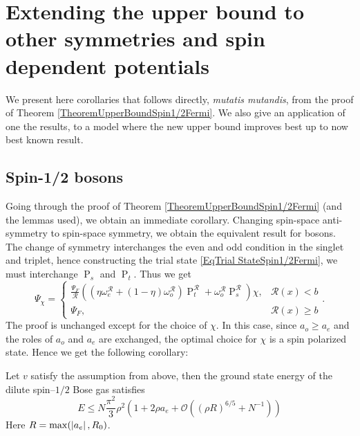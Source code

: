 \section{Extending the upper bound to other symmetries and spin dependent potentials}
We present here corollaries that follows directly, \emph{mutatis mutandis}, from the proof of Theorem \ref{TheoremUpperBoundSpin1/2Fermi}. We also give an application of one the results, to a model where the new upper bound improves best up to now best known result.
\subsection{Spin-1/2 bosons}
Going through the proof of Theorem \ref{TheoremUpperBoundSpin1/2Fermi} (and the lemmas used), we obtain an immediate corollary. Changing spin-space anti-symmetry to spin-space symmetry, we obtain the equivalent result for bosons. The change of symmetry interchanges the even and odd condition in the singlet and triplet, hence constructing the trial state \eqref{EqTrial StateSpin1/2Fermi}, we must interchange $ \operatorname{P}_s $ and $ \operatorname{P}_t $. Thus we get \begin{equation}\label{EqTrial StateSpin1/2Bose}
\Psi_\chi=\begin{cases}
\frac{\Psi_F}{\mathcal{R}}\left(\left(\eta\omega^{\mathcal{R}}_e+(1-\eta)\omega^{\mathcal{R}}_o\right)\operatorname{P}_t^{\mathcal{R}}+\omega_o^{\mathcal{R}}\operatorname{P}_s^{\mathcal{R}}\right)\chi,&\mathcal{R}(x)<b\\
\Psi_F,&\mathcal{R}(x)\geq b
\end{cases}.
\end{equation}
The proof is unchanged except for the choice of $ \chi $. In this case, since $ a_o\geq a_e $ and the roles of $ a_o $ and $ a_e $ are exchanged, the optimal choice for $ \chi $ is a spin polarized state. Hence we get the following corollary:
\begin{corollary}\label{CorollaryUpperBoundSpin1/2Bose}
	Let $ v $ satisfy the assumption from above, then the ground state energy of the dilute spin--$ 1/2 $ Bose gas satisfies\begin{equation}
		E\leq N\frac{\pi^2}{3}\rho^2\left(1+2\rho a_e+\mathcal{O}\left((\rho R)^{6/5}+N^{-1}\right)\right)
	\end{equation}
	Here $ R=\max(\left\lvert a_e \right\rvert, R_0) $.
\end{corollary}


